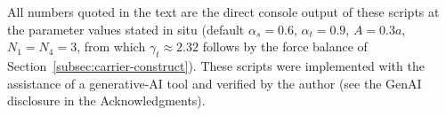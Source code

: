 All numbers quoted in the text are the direct console output of these scripts at the parameter
values stated in situ (default $\alpha_s=0.6$, $\alpha_t=0.9$, $A=0.3a$, $N_1=N_4=3$, from which
$\gamma_t\approx 2.32$ follows by the force balance of Section~\ref{subsec:carrier-construct}).
These scripts were implemented with the assistance of a generative-AI tool and verified by the
author (see the GenAI disclosure in the Acknowledgments).
